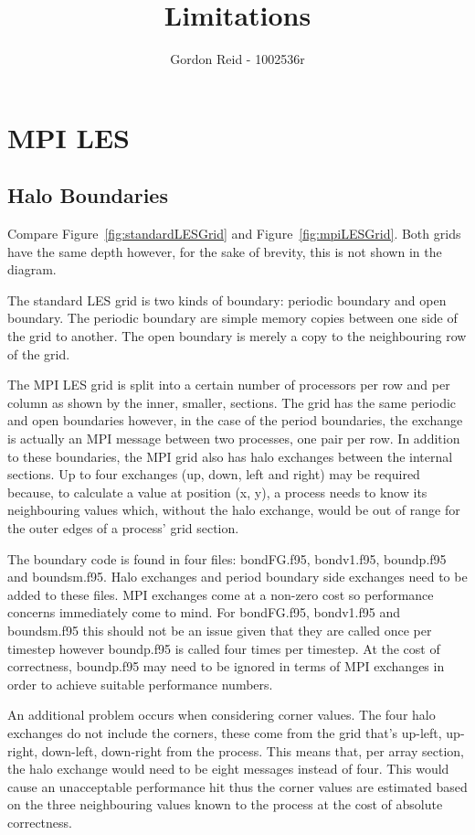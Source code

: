 \documentclass{article}
\title{Limitations}
\author{Gordon Reid - 1002536r}
\begin{document}
\maketitle

\section{MPI LES}

\subsection{Halo Boundaries}

Compare Figure~\ref{fig:standardLESGrid} and Figure~\ref{fig:mpiLESGrid}. Both
grids have the same depth however, for the sake of brevity, this is not shown in
the diagram.

The standard LES grid is two kinds of boundary: periodic boundary and open
boundary. The periodic boundary are simple memory copies between one side of the
grid to another. The open boundary is merely a copy to the neighbouring row of
the grid.

The MPI LES grid is split into a certain number of processors per row and per
column as shown by the inner, smaller, sections. The grid has the same periodic
and open boundaries however, in the case of the period boundaries, the exchange
is actually an MPI message between two processes, one pair per row. In addition
to these boundaries, the MPI grid also has halo exchanges between the internal
sections. Up to four exchanges (up, down, left and right) may be required
because, to calculate a value at position (x, y), a process needs to know its
neighbouring values which, without the halo exchange, would be out of range for
the outer edges of a process' grid section.

The boundary code is found in four files: bondFG.f95, bondv1.f95, boundp.f95 and
boundsm.f95. Halo exchanges and period boundary side exchanges need to be added
to these files. MPI exchanges come at a non-zero cost so performance concerns
immediately come to mind. For bondFG.f95, bondv1.f95 and boundsm.f95 this should
not be an issue given that they are called once per timestep however boundp.f95
is called four times per timestep. At the cost of correctness, boundp.f95 may
need to be ignored in terms of MPI exchanges in order to achieve suitable
performance numbers.

An additional problem occurs when considering corner values. The four halo
exchanges do not include the corners, these come from the grid that's up-left,
up-right, down-left, down-right from the process. This means that, per array
section, the halo exchange would need to be eight messages instead of four. This
would cause an unacceptable performance hit thus the corner values are estimated
based on the three neighbouring values known to the process at the cost of
absolute correctness.
\end{document}
